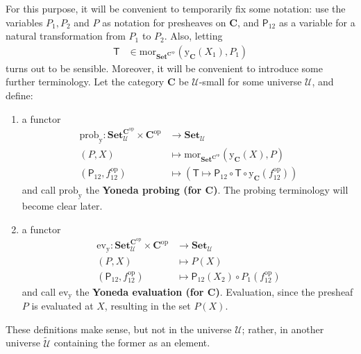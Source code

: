 For this purpose, it will be convenient to temporarily fix some notation: use the variables $P_{1}, P_{2}$ and $P$ as notation for presheaves on $\mathbf{C}$, and $\mathsf{P}_{12}$ as a variable for a natural transformation from $P_{1}$ to $P_{2}$.
Also, letting
\begin{align*}
  \mathsf{T}
  &\in
  \mathrm{mor}_{\mathbf{Set}^{\mathbf{C}^{\mathrm{op}}}}
  (\mathrm{y}_{\mathbf{C}}(X_{1}),P_{1})
\end{align*}
turns out to be sensible.
Moreover, it will be convenient to introduce some further terminology.
Let the category $\mathbf{C}$ be $\mathcal{U}$-small for some universe $\mathcal{U}$, and define:
\begin{enumerate}
\item[(a)]
a functor
\begin{align*}
  \mathrm{prob}_{\mathrm{y}}
  \colon
  \mathbf{Set}_{\mathcal{U}}^{\mathbf{C}^{\mathrm{op}}}
  \times
  \mathbf{C}^{\mathrm{op}}
  &\rightarrow
  \mathbf{Set}_{\mathcal{U}}
  \\
  (P,X)
  &\mapsto
  \mathrm{mor}_{\mathbf{Set}^{\mathbf{C}^{\mathrm{op}}}}
  (\mathrm{y}_{\mathbf{C}}(X),P)
  \\
  \left(
    \mathsf{P}_{12},
    f_{12}^{\mathrm{op}}
  \right)
  &\mapsto
  \left(
    \mathsf{T}
    \mapsto
    \mathsf{P}_{12}
    \circ
    \mathsf{T}
    \circ
    \mathrm{y}_{\mathbf{C}}(f_{12}^{\mathrm{op}})
  \right)
\end{align*}
and call $\mathrm{prob}_{\mathrm{y}}$ the \textbf{Yoneda probing (for $\mathbf{C}$)}.
The {\glqq}probing{\grqq} terminology will become clear later. 
\item[(b)]
a functor
\begin{align*}
  \mathrm{ev}_{\mathrm{y}}
  \colon
  \mathbf{Set}_{\mathcal{U}}^{\mathbf{C}^{\mathrm{op}}}
  \times
  \mathbf{C}^{\mathrm{op}}
  &\rightarrow
  \mathbf{Set}_{\mathcal{U}}
  \\
  (P,X)
  &\mapsto
  P(X)
  \\
  \left(
    \mathsf{P}_{12},
    f_{12}^{\mathrm{op}}
  \right)
  &\mapsto
  \mathsf{P}_{12}(X_{2})
  \circ
  P_{1}(f_{12}^{\mathrm{op}})
\end{align*}
and call $\mathrm{ev}_{\mathrm{y}}$ the \textbf{Yoneda evaluation (for $\mathbf{C}$)}.
{\glqq}Evaluation{\grqq}, since the presheaf $P$ is evaluated at $X$, resulting in the set $P(X)$.
\end{enumerate}
These definitions make sense, but not in the universe $\mathcal{U}$; rather, in another universe $\tilde{\mathcal{U}}$ containing the former as an element.
